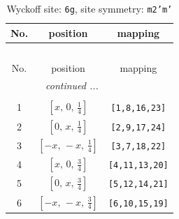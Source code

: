\documentclass[fleqn,8pt]{jsarticle}
\begin{document}
\renewcommand{\arraystretch}{1.2}
\begin{longtable}{ccc}
\caption{Wyckoff site: {\tt 6g}, site symmetry: {\tt m2'm'}}
 \\
 \hline \hline
No. & position & mapping \\ \hline \endfirsthead

\multicolumn{2}{l}{\tablename\ \thetable{}} \\
 \hline \hline
No. & position & mapping \\ \hline \endhead

 \hline \hline
\multicolumn{2}{r}{\footnotesize\it continued ...} \\ \endfoot

 \hline \hline
\multicolumn{2}{r}{} \\ \endlastfoot

1 & $\left[ x,\, 0,\, \frac{1}{4} \right]$ & {\tt [1,8,16,23]} \\ \hline
2 & $\left[ 0,\, x,\, \frac{1}{4} \right]$ & {\tt [2,9,17,24]} \\ \hline
3 & $\left[ - x,\, - x,\, \frac{1}{4} \right]$ & {\tt [3,7,18,22]} \\ \hline
4 & $\left[ x,\, 0,\, \frac{3}{4} \right]$ & {\tt [4,11,13,20]} \\ \hline
5 & $\left[ 0,\, x,\, \frac{3}{4} \right]$ & {\tt [5,12,14,21]} \\ \hline
6 & $\left[ - x,\, - x,\, \frac{3}{4} \right]$ & {\tt [6,10,15,19]} \\
\end{longtable}
\renewcommand{\arraystretch}{1.2}
\end{document}
